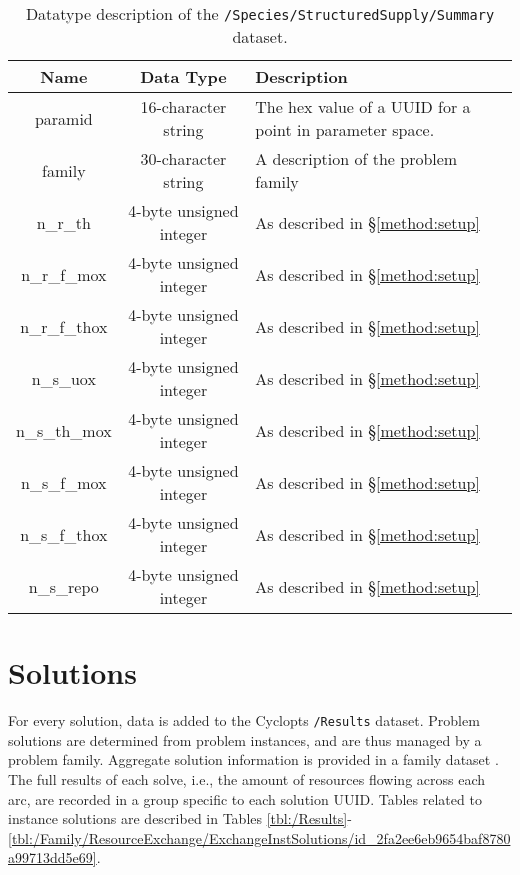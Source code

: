 \begin{table}[h!]
\centering
\caption{
\label{tbl:/Species/StructuredSupply/Summary}
Datatype description of the \lstinline[basicstyle=\ttfamily\color{black}]|/Species/StructuredSupply/Summary| dataset.}
\begin{tabularx}{\columnwidth-10pt}{|c|c|X|} %
\hline
\textbf{Name} & \textbf{Data Type} & \textbf{Description}       \\ \hline
paramid & 16-character string & The hex value of a UUID for a point in parameter space. \\ \hline
family & 30-character string & A description of the problem family \\ \hline
n\_r\_th & 4-byte unsigned integer & As described in \S \ref{method:setup} \\ \hline
n\_r\_f\_mox & 4-byte unsigned integer & As described in \S \ref{method:setup} \\ \hline
n\_r\_f\_thox & 4-byte unsigned integer & As described in \S \ref{method:setup} \\ \hline
n\_s\_uox & 4-byte unsigned integer & As described in \S \ref{method:setup} \\ \hline
n\_s\_th\_mox & 4-byte unsigned integer & As described in \S \ref{method:setup} \\ \hline
n\_s\_f\_mox & 4-byte unsigned integer & As described in \S \ref{method:setup} \\ \hline
n\_s\_f\_thox & 4-byte unsigned integer & As described in \S \ref{method:setup} \\ \hline
n\_s\_repo & 4-byte unsigned integer & As described in \S \ref{method:setup} \\ \hline
\end{tabularx}
\end{table}

\section{Solutions}

For every solution, data is added to the Cyclopts \texttt{/Results}
dataset. Problem solutions are determined from problem instances, and are thus
managed by a problem family. Aggregate solution information is provided in a
family dataset . The
full results of each solve, i.e., the amount of resources flowing across each
arc, are recorded in a group specific to each solution UUID. Tables related to
instance solutions are described in Tables
\ref{tbl:/Results}-\ref{tbl:/Family/ResourceExchange/ExchangeInstSolutions/id_2fa2ee6eb9654baf8780a99713dd5e69}.

